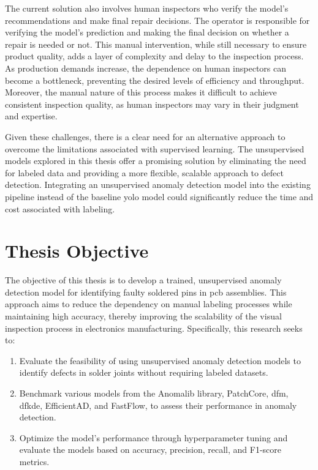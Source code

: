 The current solution also involves human inspectors who verify the model's recommendations and make final repair decisions. The operator is responsible for verifying the model's prediction and making the final decision on whether a repair is needed or not. This manual intervention, while still necessary to ensure product quality, adds a layer of complexity and delay to the inspection process. As production demands increase, the dependence on human inspectors can become a bottleneck, preventing the desired levels of efficiency and throughput. Moreover, the manual nature of this process makes it difficult to achieve consistent inspection quality, as human inspectors may vary in their judgment and expertise.

Given these challenges, there is a clear need for an alternative approach to overcome the limitations associated with supervised learning. The unsupervised models explored in this thesis offer a promising solution by eliminating the need for labeled data and providing a more flexible, scalable approach to defect detection. Integrating an unsupervised anomaly detection model into the existing pipeline instead of the baseline \gls{yolo} model could significantly reduce the time and cost associated with labeling. 

\section{Thesis Objective}

The objective of this thesis is to develop a trained, unsupervised anomaly detection model for identifying faulty soldered pins in \gls{pcb} assemblies. This approach aims to reduce the dependency on manual labeling processes while maintaining high accuracy, thereby improving the scalability of the visual inspection process in electronics manufacturing. Specifically, this research seeks to:

\begin{enumerate}
    \item Evaluate the feasibility of using unsupervised anomaly detection models to identify defects in solder joints without requiring labeled datasets.

    \item Benchmark various models from the Anomalib library, PatchCore, \gls{dfm}, \gls{dfkde}, EfficientAD, and FastFlow, to assess their performance in anomaly detection.

    \item Optimize the model's performance through hyperparameter tuning and evaluate the models based on accuracy, precision, recall, and F1-score metrics.
\end{enumerate}


